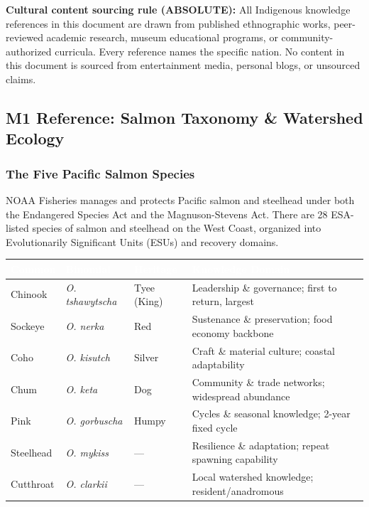 \documentclass[11pt,letterpaper]{article}
\newcommand{\tableheader}[1]{\textbf{\sffamily\textcolor{white}{#1}}}
\begin{document}
\textbf{Cultural content sourcing rule (ABSOLUTE):} All Indigenous knowledge references in this document are drawn from published ethnographic works, peer-reviewed academic research, museum educational programs, or community-authorized curricula. Every reference names the specific nation. No content in this document is sourced from entertainment media, personal blogs, or unsourced claims.

\subsection{M1 Reference: Salmon Taxonomy \& Watershed Ecology}

\subsubsection{The Five Pacific Salmon Species}

NOAA Fisheries manages and protects Pacific salmon and steelhead under both the Endangered Species Act and the Magnuson-Stevens Act. There are 28 ESA-listed species of salmon and steelhead on the West Coast, organized into Evolutionarily Significant Units (ESUs) and recovery domains.

\begin{center}
\begin{tabularx}{\textwidth}{L{2.2cm}L{2.8cm}L{2cm}X}
\toprule
{}
\tableheader{Common} & \tableheader{Binomial} & \tableheader{Heritage} & \tableheader{Knowledge Domain} \\
\midrule
Chinook & \textit{O. tshawytscha} & Tyee (King) & Leadership \& governance; first to return, largest \\
Sockeye & \textit{O. nerka} & Red & Sustenance \& preservation; food economy backbone \\
Coho & \textit{O. kisutch} & Silver & Craft \& material culture; coastal adaptability \\
Chum & \textit{O. keta} & Dog & Community \& trade networks; widespread abundance \\
Pink & \textit{O. gorbuscha} & Humpy & Cycles \& seasonal knowledge; 2-year fixed cycle \\
Steelhead & \textit{O. mykiss} & --- & Resilience \& adaptation; repeat spawning capability \\
Cutthroat & \textit{O. clarkii} & --- & Local watershed knowledge; resident/anadromous \\
\bottomrule
\end{tabularx}
\end{center}
\end{document}

